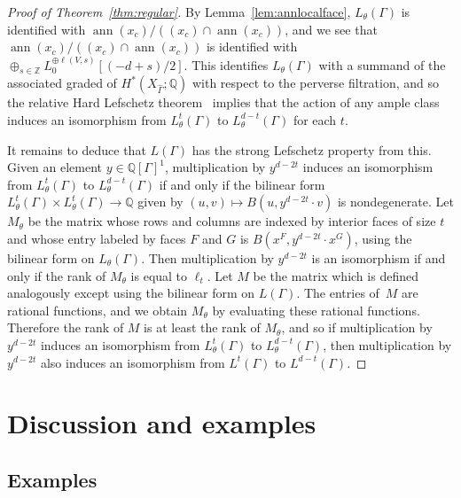 \begin{proof}[Proof of Theorem~\ref{thm:regular}]
By Lemma~\ref{lem:annlocalface}, $L_{\theta}(\Gamma)$ is identified with $\operatorname{ann}(x_c)/((x_c) \cap \operatorname{ann}(x_c))$, and we see that $\operatorname{ann}(x_c)/((x_c) \cap \operatorname{ann}(x_c))$ is identified with $\oplus_{s \in \mathbb{Z}} L_0^{\oplus \ell(V, s)}[(- d + s)/2]$. This identifies $L_{\theta}(\Gamma)$ with a summand of the associated graded of $H^*(X_{\hat{\Gamma}}; \mathbb{Q})$ with respect to the perverse filtration, and so the relative Hard Lefschetz theorem~\cite[Theorem 1.6.3]{dCM} implies that the action of any ample class induces an isomorphism from $L_{\theta}^{t}(\Gamma)$ to $L_{\theta}^{d-t}(\Gamma)$ for each $t$. 

It remains to deduce that $L(\Gamma)$ has the strong Lefschetz property from this. Given an element $y \in \mathbb{Q}[\Gamma]^1$, multiplication by $y^{d - 2t}$ induces an isomorphism from $L^t_{\theta}(\Gamma)$ to $L^{d - t}_{\theta}(\Gamma)$ if and only if the bilinear form $L^t_{\theta}(\Gamma) \times L^t_{\theta}(\Gamma) \to \mathbb{Q}$ given by $(u, v) \mapsto B(u, y^{d-2t} \cdot v)$ is nondegenerate. Let $M_{\theta}$ be the matrix whose rows and columns are indexed by interior faces of size $t$ and whose entry labeled by faces $F$ and $G$ is $B(x^F, y^{d - 2t} \cdot x^G)$, using the bilinear form on $L_{\theta}(\Gamma)$. Then multiplication by $y^{d - 2t}$ is an isomorphism if and only if the rank of $M_{\theta}$ is equal to $\ell_t$. Let $M$ be the matrix which is defined analogously except using the bilinear form on $L(\Gamma)$. The entries of~$M$ are rational functions, and we obtain $M_{\theta}$ by evaluating these rational functions. Therefore the rank of $M$ is at least the rank of $M_{\theta}$, and so if multiplication by $y^{d - 2t}$ induces an isomorphism from $L^t_{\theta}(\Gamma)$ to $L^{d - t}_{\theta}(\Gamma)$, then multiplication by $y^{d - 2t}$ also induces an isomorphism from $L^t(\Gamma)$ to $L^{d - t}(\Gamma)$. 
\end{proof}

\section{Discussion and examples}

\subsection{Examples}

